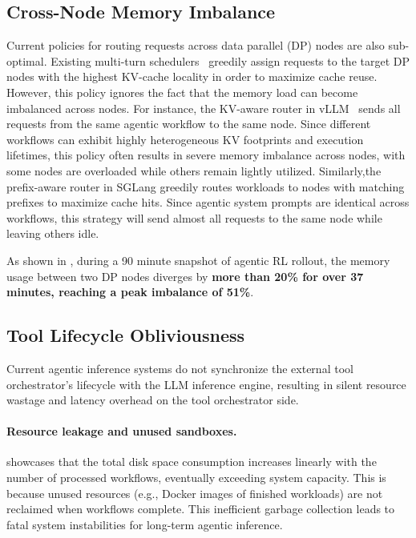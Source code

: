 \subsection{Cross-Node Memory Imbalance}
\label{sec:cross node imbalance}
Current policies for routing requests across data parallel (DP) nodes are also sub-optimal. Existing multi-turn schedulers~\citep{zheng2024sglangefficientexecutionstructured, vllm_kvaware_routing} greedily assign requests to the target DP nodes with the highest KV-cache locality in order to maximize cache reuse. However, this policy ignores the fact that the memory load can become imbalanced across nodes. For instance, the KV-aware router in vLLM~\citep{vllm_kvaware_routing} sends all requests from the same agentic workflow to the same node. Since different workflows can exhibit highly heterogeneous KV footprints and execution lifetimes, this policy often results in severe memory imbalance across nodes, with some nodes are overloaded while others remain lightly utilized. Similarly,the prefix-aware router in SGLang greedily routes workloads to nodes with matching prefixes to maximize cache hits. Since agentic system prompts are identical across workflows, this strategy will send almost all requests to the same node while leaving others idle.


As shown in , during a 90 minute snapshot of agentic RL rollout, the memory usage between two DP nodes diverges by\textbf{ more than 20\% for over 37 minutes, reaching a peak imbalance of 51\%}.

\subsection{Tool Lifecycle Obliviousness}
\label{sec:Tool mismanagement}
Current agentic inference systems do not synchronize the external tool orchestrator's lifecycle with the LLM inference engine, resulting in silent resource wastage and latency overhead on the tool orchestrator side.

\paragraph{Resource leakage and unused sandboxes.}
\vspace{-2mm}
 showcases that the total disk space consumption increases linearly with the number of processed workflows, eventually exceeding system capacity. This is because unused resources (e.g., Docker images of finished workloads) are not reclaimed when workflows complete. This inefficient garbage collection leads to fatal system instabilities for long-term agentic inference.

